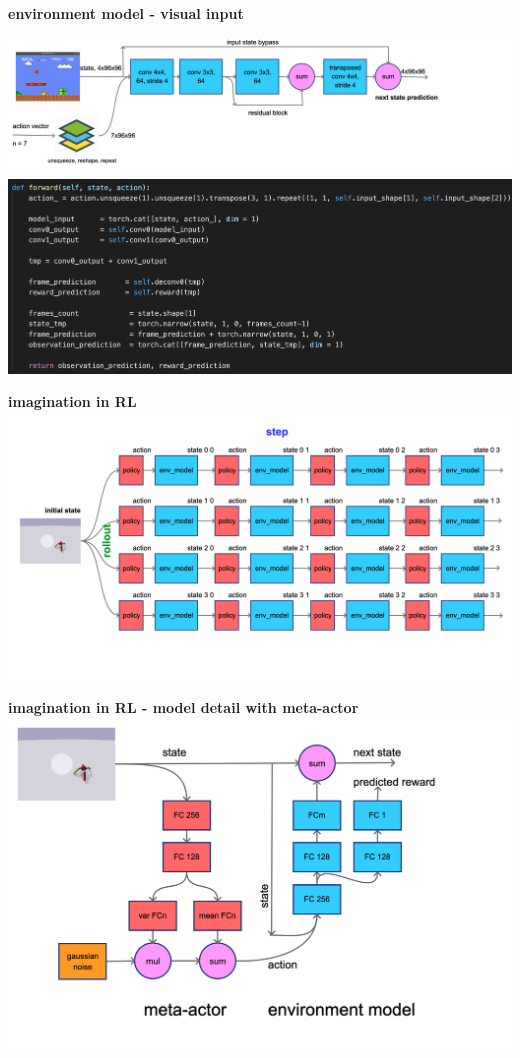 \documentclass[xcolor=dvipsnames]{beamer}
\begin{document}
\begin{frame}{\bf environment model - visual input}

  {\centering \includegraphics[scale=0.12]{../diagrams/convcuriositydetail.png}}
  {\centering \includegraphics[scale=0.3]{../images/curiosity_conv.png}}

\end{frame}

\begin{frame}{\bf imagination in RL}
  {\centering \includegraphics[scale=0.12]{../diagrams/imagination.png}}
\end{frame}

\begin{frame}{\bf imagination in RL - model detail with meta-actor}
  {\centering \includegraphics[scale=0.2]{../diagrams/imaginationmodeldetail.png}}
\end{frame}
\end{document}
